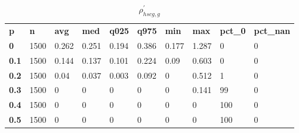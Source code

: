 \begin{table}[h]
 \centering 
\footnotesize
\caption{$\rho_{hscg,g}^\prime $}
\label{tab:alphahscgg}
\begin{tabular}[h]{| l l l l l l l l l l|
    } \hline
\textbf{ p} & \textbf{ n} & \textbf{ avg} & \textbf{ med} & \textbf{ q025} & \textbf{ q975} & \textbf{ min} & \textbf{ max} & \textbf{ pct\_0} & \textbf{ pct\_nan}
           \\
  \textbf{  0} & 1500 & 0.262 & 0.251 & 0.194 & 0.386 & 0.177 & 1.287 &   0 & 0
           \\
  \textbf{0.1} & 1500 & 0.144 & 0.137 & 0.101 & 0.224 &  0.09 & 0.603 &   0 & 0
           \\
  \textbf{0.2} & 1500 &  0.04 & 0.037 & 0.003 & 0.092 &     0 & 0.512 &   1 & 0
           \\
  \textbf{0.3} & 1500 &     0 &     0 &     0 &     0 &     0 & 0.141 &  99 & 0
           \\
  \textbf{0.4} & 1500 &     0 &     0 &     0 &     0 &     0 &     0 & 100 & 0
           \\
  \textbf{0.5} & 1500 &     0 &     0 &     0 &     0 &     0 &     0 & 100 & 0
           \\
 \hline \end{tabular}
 \end{table}
